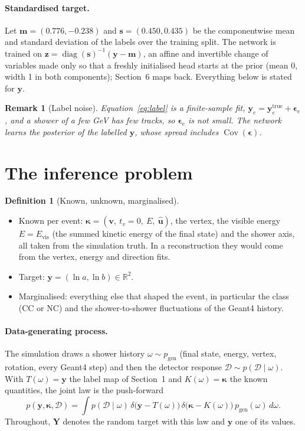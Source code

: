 \documentclass[11pt]{article}
\newtheorem{remark}{Remark}
\theoremstyle{definition}
\newtheorem{definition}{Definition}
\newcommand{\D}{\mathcal{D}}
\newcommand{\y}{\bm{y}}
\newcommand{\R}{\mathbb{R}}
\DeclareMathOperator{\diag}{diag}
\DeclareMathOperator{\Cov}{Cov}
\begin{document}
\paragraph{Standardised target.}
Let $\bm m=(0.776,-0.238)$ and $\bm s=(0.450,0.435)$ be the componentwise mean and standard deviation of the labels
over the training split. The network is trained on $\bm z = \diag(\bm s)^{-1}(\y-\bm m)$, an affine and invertible
change of variables made only so that a freshly initialised head starts at the prior (mean 0, width 1 in both
components); Section~6 maps back. Everything below is stated for $\y$.

\begin{remark}[Label noise]
Equation~\eqref{eq:label} is a finite-sample fit, $\y_e = \y_e^{\mathrm{true}}+\bm\epsilon_e$, and a shower of a
few GeV has few tracks, so $\bm\epsilon_e$ is not small. The network learns the posterior of the \emph{labelled}
$\y$, whose spread includes $\Cov(\bm\epsilon)$.
\end{remark}

\section{The inference problem}

\begin{definition}[Known, unknown, marginalised]
\leavevmode
\begin{itemize}
  \item Known per event: $\bm\kappa = (\bm v,\ t_v=0,\ E,\ \hat{\bm u})$, the vertex, the visible energy
        $E=E_{\mathrm{vis}}$ (the summed kinetic energy of the final state) and the shower axis, all taken from the
        simulation truth. In a reconstruction they would come from the vertex, energy and direction fits.
  \item Target: $\y = (\ln a,\ln b)\in\R^2$.
  \item Marginalised: everything else that shaped the event, in particular the class (CC or NC) and the
        shower-to-shower fluctuations of the Geant4 history.
\end{itemize}
\end{definition}

\paragraph{Data-generating process.}
The simulation draws a shower history $\omega\sim p_{\mathrm{gen}}$ (final state, energy, vertex, rotation, every
Geant4 step) and then the detector response $\D\sim p(\D\mid\omega)$. With $T(\omega)=\y$ the label map of
Section~1 and $K(\omega)=\bm\kappa$ the known quantities, the joint law is the push-forward
\begin{equation}
  p(\y,\bm\kappa,\D) = \int p(\D\mid\omega)\,\delta\big(\y-T(\omega)\big)\,\delta\big(\bm\kappa-K(\omega)\big)\,
  p_{\mathrm{gen}}(\omega)\,d\omega .
  \label{eq:joint}
\end{equation}
Throughout, $\bm Y$ denotes the random target with this law and $\y$ one of its values.
\end{document}
